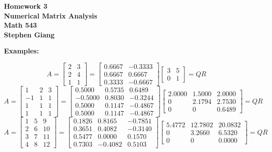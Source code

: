 \documentclass[12pt]{article}
\begin{document}
	
	\begin{center}
		\textbf{Homework 3} \\
		\textbf{Numerical Matrix Analysis} \\
		\textbf{Math 543} \\
		\textbf{Stephen Giang} \\
	\end{center}

\noindent \textbf{Examples: }
\begin{center}
	$$ 
	A =
		\begin{bmatrix}
			2 & 3 \\
			2 & 4 \\
			1 & 1
		\end{bmatrix}
		= 
		\begin{bmatrix}
			0.6667 &  -0.3333 \\
			0.6667 &   0.6667 \\
			0.3333 &  -0.6667
		\end{bmatrix}
		\begin{bmatrix}
			3 & 5 \\
			0 & 1
		\end{bmatrix}
	= QR 
	$$
	$$
	A =
		\begin{bmatrix}
		1  &   2  &  3 \\
	   -1  &   1  &  1 \\
		1  &   1  &  1 \\
		1  &   1  &  1
		\end{bmatrix}
		= 
		\begin{bmatrix}
		0.5000  &  0.5735  &   0.6489 \\
	   -0.5000  &  0.8030  &  -0.3244 \\
		0.5000  &  0.1147  &  -0.4867 \\
		0.5000  &  0.1147  &  -0.4867
		\end{bmatrix}
		\begin{bmatrix}
		2.0000 &   1.5000  &  2.0000 \\
		0  &  2.1794  &  2.7530 \\
		0   &      0  &  0.6489 
		\end{bmatrix}
	= QR 
	$$
	$$
	A =
		\begin{bmatrix}
		1  &   5  &   9 \\
		2  &   6  &  10 \\
		3  &   7  &  11 \\
		4  &   8  &  12
		\end{bmatrix}
		= 
		\begin{bmatrix}
		0.1826  &  0.8165  & -0.7851 \\
		0.3651  &  0.4082  & -0.3140 \\
		0.5477  &  0.0000  &  0.1570 \\
		0.7303  & -0.4082  &  0.5103
		\end{bmatrix}
		\begin{bmatrix}
		5.4772 &  12.7802 &  20.0832 \\
		0  &  3.2660  &  6.5320 \\
		0    &     0  &  0.0000 
		\end{bmatrix}
	= QR 
	$$
\end{center}
\end{document}
